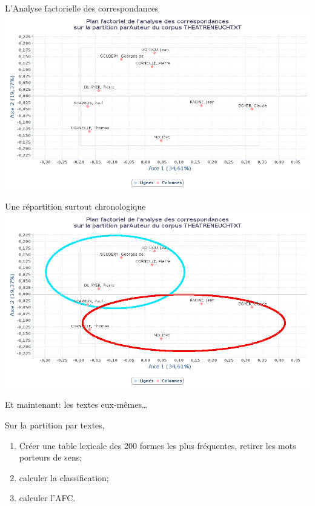 \documentclass{beamer}
\begin{document}
\begin{frame}{L'Analyse factorielle des correspondances}
\includegraphics[width=\textwidth]{img/parAuteur_word_AFC_1-2.png}
\end{frame}

\begin{frame}{Une répartition surtout chronologique}
\includegraphics[width=\textwidth]{img/parAuteur_word_AFC_1-2_edit.png}
\end{frame}


\begin{frame}{Et maintenant: les textes eux-mêmes…}

	Sur la partition par textes,
\begin{enumerate}
	\item Créer une table lexicale des 200 formes les plus fréquentes, retirer les mots porteurs de sens;
	\item calculer la classification;
	\item calculer l'AFC.
\end{enumerate}

\end{frame}
\end{document}
